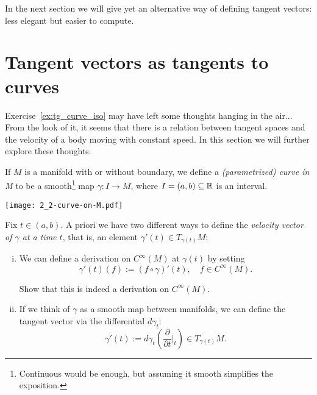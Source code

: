 In the next section we will give yet an alternative way of defining tangent vectors: less elegant but easier to compute.


\section{Tangent vectors as tangents to curves}

Exercise~\ref{ex:tg_curve_iso} may have left some thoughts hanging in the air...
From the look of it, it seems that there is a relation between tangent spaces and the velocity of a body moving with constant speed.
In this section we will further explore these thoughts.

\begin{definition}
  If $M$ is a manifold with or without boundary, we define a \emph{(parametrized) curve in M} to be a smooth\footnote{Continuous would be enough, but assuming it smooth simplifies the exposition.} map $\gamma : I \to M$, where $I=(a,b)\subseteq\mathbb{R}$ is an interval.
\end{definition}
\begin{marginfigure}
  \texttt{[image: 2\_2-curve-on-M.pdf]}
\end{marginfigure}

Fix $t\in(a,b)$. 
A priori we have two different ways to define the \emph{velocity vector of $\gamma$ at a time $t$}, that is, an element $\gamma'(t) \in T_{\gamma(t)}M$:
\begin{enumerate}[(i)]
  \item We can define a derivation on $C^\infty(M)$ at $\gamma(t)$ by setting
  \begin{equation}\label{eq:tg_curve_der}
    \gamma'(t) (f) := (f\circ\gamma)'(t), \quad f\in C^\infty(M).
  \end{equation}
  \begin{exercise}
    Show that this is indeed a derivation on $C^\infty(M)$.
  \end{exercise}
  \item If we think of $\gamma$ as a smooth map between manifolds, we can define the tangent vector via the differential $d\gamma_t$:
  \begin{equation}\label{eq:tg_curve_diff}
    \gamma'(t):= d\gamma_t\left(\frac{\partial}{\partial t}\Big|_t\right) \in T_{\gamma(t)}M.
  \end{equation}
\end{enumerate}

